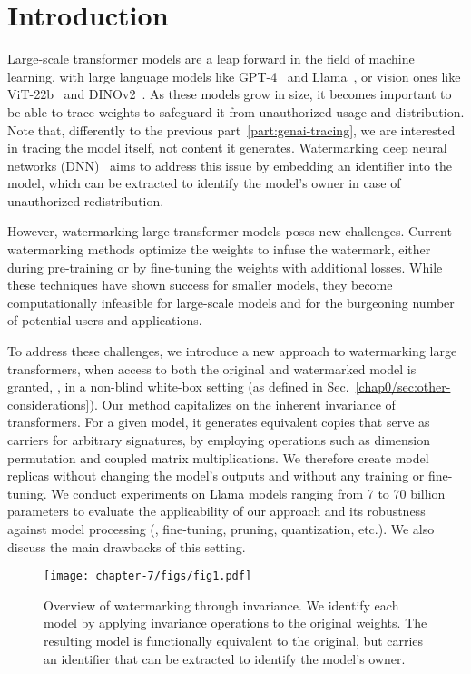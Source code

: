 
\section{Introduction}

Large-scale transformer models are a leap forward in the field of machine learning, with large language models like GPT-4~\citep{openai2023gpt} and Llama~\citep{touvron2023llama}, or vision ones like ViT-22b~\citep{dehghani2023scaling} and DINOv2~\citep{oquab2023dinov2}.
As these models grow in size, it becomes important to be able to trace weights to safeguard it from unauthorized usage and distribution.
Note that, differently to the previous part~\ref{part:genai-tracing}, we are interested in tracing the model itself, not content it generates.
Watermarking deep neural networks (DNN)~\citep{uchida2017embedding, adi2018turning} aims to address this issue by embedding an identifier into the model, which can be extracted to identify the model's owner in case of unauthorized redistribution.


However, watermarking large transformer models poses new challenges. 
Current watermarking methods optimize the weights to infuse the watermark, either during pre-training or by fine-tuning the weights with additional losses.
While these techniques have shown success for smaller models, they become computationally infeasible for large-scale models and for the burgeoning number of potential users and applications.

To address these challenges, we introduce a new approach to watermarking large transformers, when access to both the original and watermarked model is granted, \ie, in a non-blind white-box setting (as defined in Sec.~\ref{chap0/sec:other-considerations}).
Our method capitalizes on the inherent invariance of transformers. 
For a given model, it generates equivalent copies that serve as carriers for arbitrary signatures, by employing operations such as dimension permutation and coupled matrix multiplications.
We therefore create model replicas without changing the model's outputs and without any training or fine-tuning.
We conduct experiments on Llama models ranging from 7 to 70 billion parameters to evaluate the applicability of our approach and its robustness against model processing (\eg, fine-tuning, pruning, quantization, etc.).
We also discuss the main drawbacks of this setting. 

\begin{figure}[t]
    \centering
    \texttt{[image: chapter-7/figs/fig1.pdf]}
    \caption{
        Overview of watermarking through invariance. 
        We identify each model by applying invariance operations to the original weights.
        The resulting model is functionally equivalent to the original, but carries an identifier that can be extracted to identify the model's owner.
    }
    \label{chap7/fig:overview}
\end{figure}

